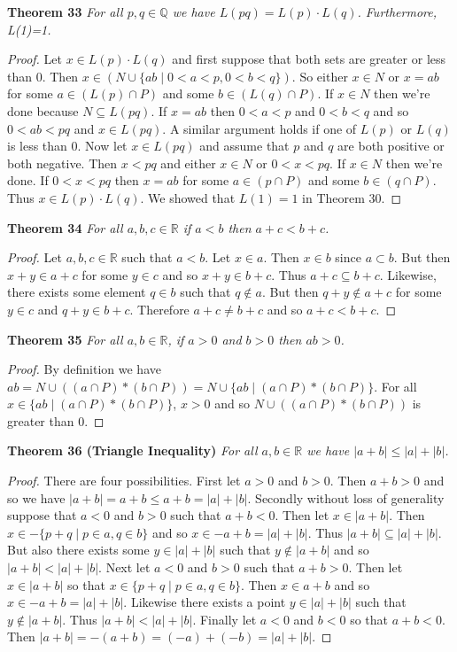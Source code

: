 \documentclass{article}
\begin{document}
\begin{flushleft}
\textbf{Theorem 33}
\textsl{For all $p,q \in \mathbb{Q}$ we have $L(pq)=L(p) \cdot L(q)$. Furthermore, L(1)=1.}
\begin{proof}
Let $x \in L(p) \cdot L(q)$ and first suppose that both sets are greater or less than $0$. Then $x \in (N \cup \{ab \mid 0<a<p, 0<b<q\})$. So either $x \in N$ or $x = ab$ for some $a \in (L(p) \cap P)$ and some $b \in (L(q) \cap P)$. If $x \in N$ then we're done because $N \subseteq L(pq)$. If $x=ab$ then $0<a<p$ and $0<b<q$ and so $0<ab<pq$ and $x \in L(pq)$. A similar argument holds if one of $L(p)$ or $L(q)$ is less than $0$. Now let $x \in L(pq)$ and assume that $p$ and $q$ are both positive or both negative. Then $x<pq$ and either $x \in N$ or $0<x<pq$. If $x \in N$ then we're done. If $0<x<pq$ then $x=ab$ for some $a \in (p \cap P)$ and some $b \in (q \cap P)$. Thus $x \in L(p) \cdot L(q)$. We showed that $L(1) = 1$ in Theorem 30.
\end{proof}

\textbf{Theorem 34}
\textsl{For all $a,b,c \in \mathbb{R}$ if $a<b$ then $a+c<b+c$.}
\begin{proof}
Let $a,b,c \in \mathbb{R}$ such that $a<b$. Let $x \in a$. Then $x \in b$ since $a \subset b$. But then $x+y \in a+c$ for some $y \in c$ and so $x+y \in b+c$. Thus $a+c \subseteq b+c$. Likewise, there exists some element $q \in b$ such that $q \notin a$. But then $q+y \notin a+c$ for some $y \in c$ and $q+y \in b+c$. Therefore $a+c \neq b+c$ and so $a+c < b+c$.
\end{proof}

\textbf{Theorem 35}
\textsl{For all $a,b \in \mathbb{R}$, if $a > 0$ and $b > 0$ then $ab > 0$.}
\begin{proof}
By definition we have $ab=N \cup ((a \cap P) * (b \cap P))=N \cup \{ab \mid (a \cap P) * (b \cap P)\}$. For all $x \in \{ab \mid (a \cap P) * (b \cap P)\}$, $x>0$ and so $N \cup ((a \cap P) * (b \cap P))$ is greater than $0$.
\end{proof}

\textbf{Theorem 36 (Triangle Inequality)}
\textsl{For all $a,b \in \mathbb{R}$ we have $|a+b| \leq |a| + |b|$.}
\begin{proof}
There are four possibilities. First let $a>0$ and $b>0$. Then $a+b>0$ and so we have $|a+b| = a+b \leq a+b = |a| + |b|$. Secondly without loss of generality suppose that $a<0$ and $b>0$ such that $a+b<0$. Then let $x \in |a+b|$. Then $x \in -\{p+q \mid p \in a, q \in b\}$ and so $x \in -a + b=|a| + |b|$. Thus $|a+b| \subseteq |a| + |b|$. But also there exists some $y \in |a|+|b|$ such that $y \notin |a+b|$ and so $|a+b| < |a| + |b|$. Next let $a<0$ and $b>0$ such that $a+b>0$. Then let $x \in |a+b|$ so that $x \in \{p+q \mid p \in a, q \in b\}$. Then $x \in a+b$ and so $x \in -a + b=|a|+|b|$. Likewise there exists a point $y \in |a|+|b|$ such that $y \notin |a+b|$. Thus $|a+b| < |a|+|b|$. Finally let $a<0$ and $b<0$ so that $a+b<0$. Then $|a+b|=-(a+b)=(-a)+(-b)=|a|+|b|$.
\end{proof}

\end{flushleft}
\end{document}
